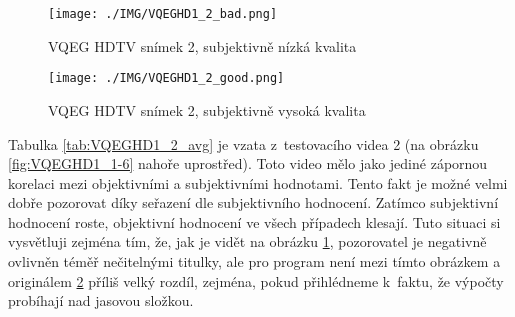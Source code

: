 \documentclass[thesis=M,czech]{FITthesis}[2016/06/26]
\begin{document}
\begin{figure}[]\centering
\texttt{[image: ./IMG/VQEGHD1\_2\_bad.png]}
\caption{VQEG HDTV snímek 2, subjektivně nízká kvalita}
\label{fig:VQEGHD1_2_bad}
\end{figure}
\begin{figure}[]\centering
\texttt{[image: ./IMG/VQEGHD1\_2\_good.png]}
\caption{VQEG HDTV snímek 2, subjektivně vysoká kvalita}
\label{fig:VQEGHD1_2_good}
\end{figure}
Tabulka \ref{tab:VQEGHD1_2_avg} je vzata z~testovacího videa 2 (na obrázku \ref{fig:VQEGHD1_1-6} nahoře uprostřed). Toto video mělo jako jediné zápornou korelaci mezi objektivními a subjektivními hodnotami. Tento fakt je možné velmi dobře pozorovat díky seřazení dle subjektivního hodnocení. Zatímco subjektivní hodnocení roste, objektivní hodnocení ve všech případech klesají. Tuto situaci si vysvětluji zejména tím, že, jak je vidět na obrázku \ref{fig:VQEGHD1_2_bad}, pozorovatel je negativně ovlivněn téměř nečitelnými titulky, ale pro program není mezi tímto obrázkem a originálem \ref{fig:VQEGHD1_2_good} příliš velký rozdíl, zejména, pokud přihlédneme k~faktu, že výpočty probíhají nad jasovou složkou. 
\end{document}

